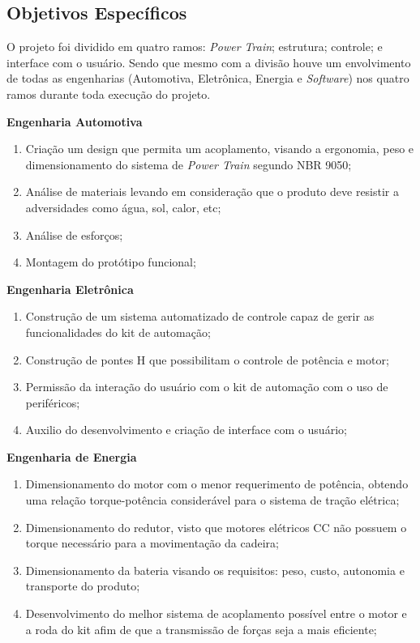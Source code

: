 \subsection{Objetivos Específicos}

O projeto foi dividido em quatro ramos: \textit{Power Train}; estrutura; controle; e interface com o usuário. Sendo que mesmo com a divisão houve um envolvimento de todas as engenharias (Automotiva, Eletrônica, Energia e \textit{Software}) nos quatro ramos durante toda execução do projeto.

\textbf{Engenharia Automotiva}

  \begin{enumerate}
    \item Criação um design que permita um acoplamento, visando a ergonomia, peso e dimensionamento do sistema de \textit{Power Train} segundo NBR 9050;
    \item Análise de materiais levando em consideração que o produto deve resistir a adversidades como água, sol, calor, etc;
    \item Análise de esforços;
    \item Montagem do protótipo funcional;
  \end{enumerate}

\textbf{Engenharia Eletrônica}
  \begin{enumerate}
    \item Construção de um sistema automatizado de controle capaz de gerir as funcionalidades do kit de automação;
    \item Construção de pontes H que possibilitam o controle de potência e motor;
    \item Permissão da interação do usuário com o kit de automação com o uso de periféricos;
    \item Auxilio do desenvolvimento e criação de interface com o usuário;
  \end{enumerate}

\textbf{Engenharia de Energia}
  \begin{enumerate}
    \item Dimensionamento do motor com o menor requerimento de potência, obtendo uma relação torque-potência considerável para o sistema de tração elétrica;
    \item Dimensionamento do redutor, visto que motores elétricos CC não possuem o torque necessário para a movimentação da cadeira;
    \item Dimensionamento da bateria visando os requisitos: peso, custo, autonomia e transporte do produto;
    \item Desenvolvimento do melhor sistema de acoplamento possível entre o motor e a roda do kit afim de que a transmissão de forças seja a mais eficiente;
  \end{enumerate}

